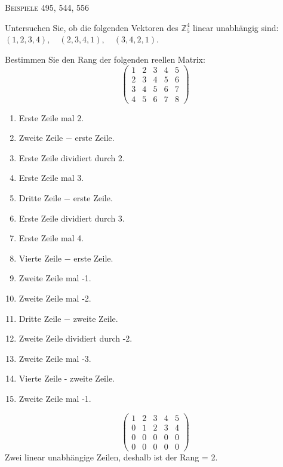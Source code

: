\documentclass[a4paper, 12pt, margins=3cm]{homework}
\newcommand{\Z}{\mathbb{Z}}
\begin{document}
  \begin{center}
    \textsc{Beispiele 495, 544, 556}
  \end{center}


  \begin{problem}
    Untersuchen Sie, ob die folgenden Vektoren des $\Z_5^4$ linear unabhängig sind:
    $(1,2,3,4),\quad (2,3,4,1),\quad (3,4,2,1)$.
  \end{problem}
  \begin{solution}
    
  \end{solution}


  \begin{problem}
    Bestimmen Sie den Rang der folgenden reellen Matrix:
    \[ 
      \begin{pmatrix}
        1 & 2 & 3 & 4 & 5 \\
        2 & 3 & 4 & 5 & 6 \\
        3 & 4 & 5 & 6 & 7 \\
        4 & 5 & 6 & 7 & 8
      \end{pmatrix}
    \]

  \end{problem}
  \begin{solution}\hfill
    \begin{enumerate}\itemsep0pt
      \item Erste Zeile mal $2$.
      \item Zweite Zeile $-$ erste Zeile.
      \item Erste Zeile dividiert durch 2.
      \item Erste Zeile mal 3.
      \item Dritte Zeile $-$ erste Zeile.
      \item Erste Zeile dividiert durch 3.
      \item Erste Zeile mal 4.
      \item Vierte Zeile $-$ erste Zeile.
      \item Zweite Zeile mal -1.
      \item Zweite Zeile mal -2.
      \item Dritte Zeile $-$ zweite Zeile.
      \item Zweite Zeile dividiert durch -2.
      \item Zweite Zeile mal -3.
      \item Vierte Zeile - zweite Zeile.
      \item Zweite Zeile mal -1.
    \end{enumerate}
    \[
      \begin{pmatrix}
        1 & 2 & 3 & 4 & 5\\
        0 & 1 & 2 & 3 & 4\\
        0 & 0 & 0 & 0 & 0\\
        0 & 0 & 0 & 0 & 0
      \end{pmatrix}
    \]
    Zwei linear unabhängige Zeilen, deshalb ist der Rang = 2.
  \end{solution}
\end{document}
